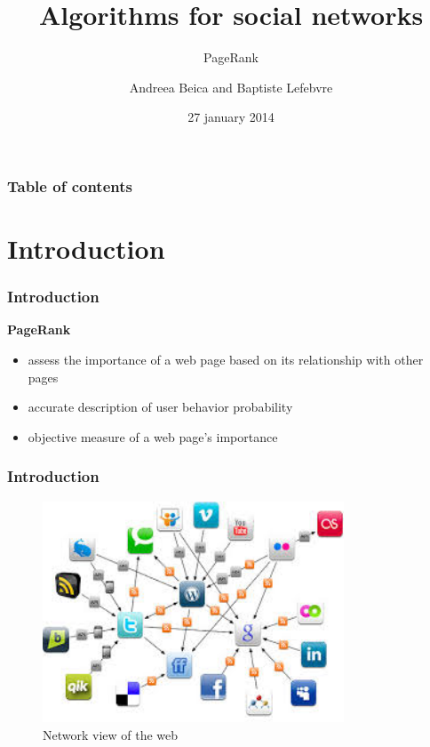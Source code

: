\documentclass[10pt]{beamer}
\begin{document}
  
  \title{Algorithms for social networks}
  \subtitle{PageRank}
  \author{Andreea Beica and Baptiste Lefebvre}
  \date{27 january 2014}
  \maketitle

  
\begin{frame}
  \frametitle{Table of contents}
  \tableofcontents
\end{frame}


\section{Introduction}

\begin{frame}
\frametitle{Introduction}
\textbf{PageRank} 
\begin{itemize}
\item assess the importance of a web page based on its relationship with other pages
\item accurate description of user behavior probability
\item objective measure of a web page's importance
\end{itemize}
\end{frame}

\begin{frame}
\frametitle{Introduction}
\begin{figure}[h]
\includegraphics[width=0.8\textwidth]{net.jpg}
\caption{Network view of the web}
\end{figure}
\end{frame}
\end{document}

